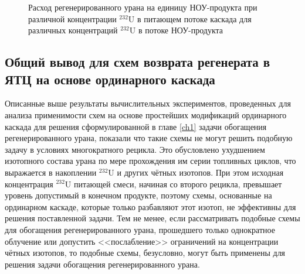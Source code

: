 \begin{figure}[ht]
  \caption{Расход регенерированного урана на единицу НОУ-продукта  при различной концентрации $^{232}$U в питающем потоке каскада для различных концентраций $^{232}$U в потоке НОУ-продукта}\label{sc3_1.second}
\end{figure}


\subsection{Общий вывод для схем возврата регенерата в ЯТЦ на основе ординарного каскада}

Описанные выше результаты вычислительных экспериментов, проведенных для анализа применимости схем на основе простейших модификаций ординарного каскада для решения сформулированной в главе \ref{ch1} задачи обогащения регенерированного урана, показали что такие схемы не могут решить подобную задачу в условиях  многократного рецикла. Это обусловлено ухудшением изотопного состава урана по мере прохождения им серии топливных циклов, что выражается в накоплении $^{232}$U и других чётных изотопов. При этом исходная концентрация $^{232}$U питающей смеси, начиная со второго рецикла, превышает уровень допустимый в конечном продукте, поэтому схемы, основанные на ординарном каскаде, которые только разбавляют этот изотоп, не эффективны для решения поставленной задачи. Тем не менее, если рассматривать подобные схемы для обогащения регенерированного урана, прошедшего только однократное облучение или допустить <<послабление>> ограничений на концентрации чётных изотопов, то подобные схемы, безусловно, могут быть применены для решения задачи обогащения регенерированного урана.

